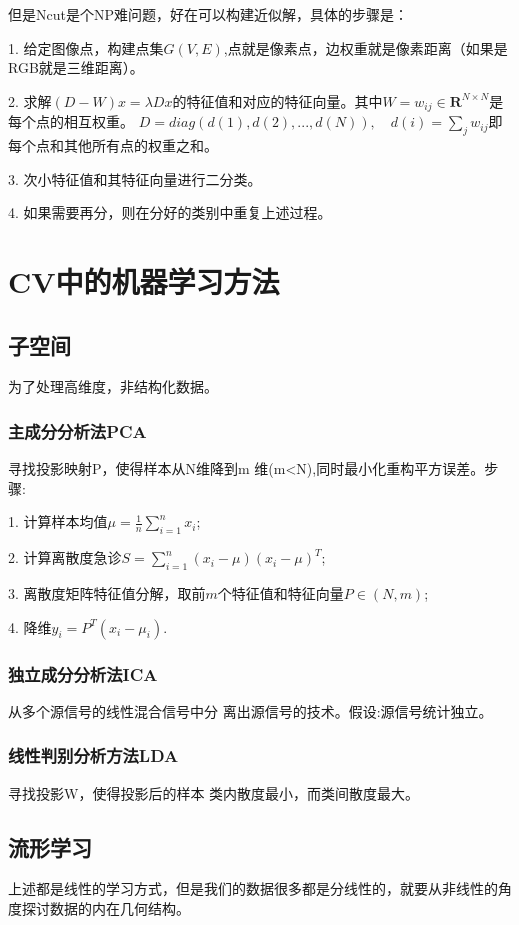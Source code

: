 \documentclass[12pt]{article}
\begin{document}
但是Ncut是个NP难问题，好在可以构建近似解，具体的步骤是：

1. 给定图像点，构建点集$G(V,E)$,点就是像素点，边权重就是像素距离（如果是RGB就是三维距离）。

2. 求解$(D-W)x=\lambda Dx$的特征值和对应的特征向量。其中$W={w_{ij}}\in\mathbf{R}^{N\times N}$是每个点的相互权重。
$D=diag(d(1),d(2),..., d(N)),\quad d(i)=\sum_jw_{ij}$即每个点和其他所有点的权重之和。

3. 次小特征值和其特征向量进行二分类。

4. 如果需要再分，则在分好的类别中重复上述过程。

\section{CV中的机器学习方法}
\subsection{子空间}
为了处理高维度，非结构化数据。

\subsubsection{主成分分析法PCA}
寻找投影映射P，使得样本从N维降到m 维(m<N),同时最小化重构平方误差。步骤:

1. 计算样本均值$\mu=\frac{1}{n}\sum_{i=1}^{n}x_i$;

2. 计算离散度急诊$S=\sum_{i=1}^{n}\left(x_{i}-\mu\right)\left(x_{i}-\mu\right)^{T}$;

3. 离散度矩阵特征值分解，取前$m$个特征值和特征向量$P\in(N,m)$;

4. 降维$y_i=P^T(x_i-\mu_i)$.

\subsubsection{独立成分分析法ICA}
从多个源信号的线性混合信号中分 离出源信号的技术。假设:源信号统计独立。

\subsubsection{线性判别分析方法LDA}
寻找投影W，使得投影后的样本 类内散度最小，而类间散度最大。

\subsection{流形学习}
上述都是线性的学习方式，但是我们的数据很多都是分线性的，就要从非线性的角度探讨数据的内在几何结构。
\end{document}
